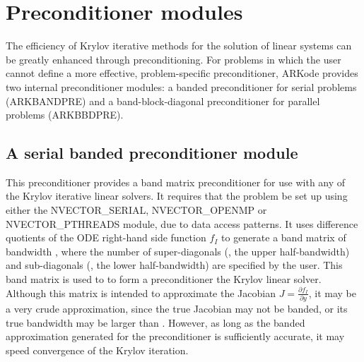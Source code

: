 \documentclass[letterpaper,10pt,english]{sphinxmanual}
\begin{document}
\section{Preconditioner modules}
\label{c_interface/Preconditioners::doc}\label{c_interface/Preconditioners:cinterface-preconditionermodules}\label{c_interface/Preconditioners:preconditioner-modules}
The efficiency of Krylov iterative methods for the solution of linear
systems can be greatly enhanced through preconditioning.  For problems
in which the user cannot define a more effective, problem-specific
preconditioner, ARKode provides two internal preconditioner modules:
a banded preconditioner for serial problems (ARKBANDPRE) and a
band-block-diagonal preconditioner  for parallel problems (ARKBBDPRE).


\subsection{A serial banded preconditioner module}
\label{c_interface/Preconditioners:cinterface-bandpre}\label{c_interface/Preconditioners:a-serial-banded-preconditioner-module}
This preconditioner provides a band matrix preconditioner for use with
any of the Krylov iterative linear solvers.  It requires that the
problem be set up using either the NVECTOR\_SERIAL, NVECTOR\_OPENMP or
NVECTOR\_PTHREADS module, due to data access patterns.  It uses
difference quotients of the ODE right-hand side function \(f_I\)
to generate a band matrix of bandwidth , where the
number of super-diagonals (, the upper half-bandwidth) and
sub-diagonals (, the lower half-bandwidth) are specified by the
user.  This band matrix is used to to form a preconditioner the Krylov
linear solver.  Although this matrix is intended to approximate the
Jacobian \(J = \frac{\partial f_I}{\partial y}\), it may be a
very crude approximation, since the true Jacobian may not be banded,
or its true bandwidth may be larger than .  However, as
long as the banded approximation generated for the preconditioner is
sufficiently accurate, it may speed convergence of the Krylov
iteration.
\end{document}
